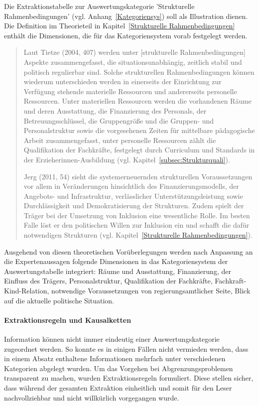 Die Extraktionstabelle zur Auswertungskategorie 'Strukturelle Rahmenbedingungen' (vgl. Anhang~\ref{Kategoriensys}) soll als Illustration dienen. 
Die Definition im Theorieteil in Kapitel~\ref{Strukturelle Rahmenbedingungen} enthält die Dimensionen, die für das Kategoriensystem vorab festgelegt werden. 

\begin{quote}
Laut Tietze (2004, 407) werden unter [strukturelle Rahmenbedingungen] Aspekte zusammengefasst, die situationsunabhängig, zeitlich stabil und politisch regulierbar sind. Solche strukturellen Rahmenbedingungen können wiederum unterschieden werden in einerseits der Einrichtung zur Verfügung stehende materielle Ressourcen und andererseits personelle Ressourcen. Unter materiellen Ressourcen werden die vorhandenen Räume und deren Ausstattung, die Finanzierung des Personals, der Betreuungsschlüssel, die Gruppengröße und die Gruppen- und Personalstruktur sowie die vorgesehenen Zeiten für mittelbare pädagogische Arbeit zusammengefasst, unter personelle Ressourcen zählt die Qualifikation der Fachkräfte, festgelegt durch Curriculum und Standards in der Erzieherinnen-Ausbildung (vgl. Kapitel~\ref{subsec:Strukturquali}). 

Jerg (2011, 54) sieht die systemerneuernden strukturellen Voraussetzungen vor allem in Veränderungen hinsichtlich des Finanzierungsmodells, der Angebots- und Infrastruktur, verlässlicher Unterstützungsleistung sowie Durchlässigkeit und Demokratisierung der Strukturen. Zudem spielt der Träger bei der Umsetzung von Inklusion eine wesentliche Rolle. Im besten Falle löst er den politischen Willen zur Inklusion ein und schafft die dafür notwendigen Strukturen (vgl. Kapitel~\ref{Strukturelle Rahmenbedingungen}). 
\end{quote}

Ausgehend von diesen theoretischen Vorüberlegungen werden nach Anpassung an die Expertenaussagen folgende Dimensionen in das Kategoriensystem der Auswertungstabelle integriert:  
Räume und Ausstattung, Finanzierung, der Einfluss des Trägers, Personalstruktur, Qualifikation der Fachkräfte, Fachkraft-Kind-Relation, notwendige Voraussetzungen von regierungsamtlicher Seite, Blick auf die aktuelle politische Situation.
 
\paragraph{Extraktionsregeln und Kausalketten} Information können nicht immer eindeutig einer Auswertungskategorie zugeordnet werden. So konnte es in einigen Fällen nicht vermieden werden, dass in einem Absatz enthaltene Informationen mehrfach unter verschiedenen Kategorien abgelegt wurden. Um das Vorgehen bei Abgrenzungsproblemen transparent zu machen, wurden Extraktionsregeln formuliert. Diese stellen sicher, dass während der gesamten Extraktion einheitlich und somit für den Leser nachvollziehbar und nicht willkürlich vorgegangen wurde. 

